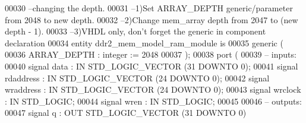 \begin{DoxyCode}
00030 \textcolor{keyword}{--changing the depth.}
00031 \textcolor{keyword}{--1)Set ARRAY\_DEPTH generic/parameter from 2048 to new depth.}
00032 \textcolor{keyword}{--2)Change mem\_array depth from 2047 to (new depth - 1).}
00033 \textcolor{keyword}{--3)VHDL only, don't forget the generic in component declaration}
00034 \textcolor{keywordflow}{entity }ddr2_mem_model_ram_module \textcolor{keywordflow}{is} 
00035         \textcolor{keywordflow}{generic} \textcolor{vhdlchar}{(}
00036                  \textcolor{vhdlchar}{ARRAY_DEPTH} \textcolor{vhdlchar}{:} \textcolor{comment}{integer} \textcolor{vhdlchar}{:=} \textcolor{vhdllogic}{}\textcolor{vhdllogic}{2048}
00037                  \textcolor{vhdlchar}{)};
00038         \textcolor{keywordflow}{port} \textcolor{vhdlchar}{(}
00039 \textcolor{keyword}{              -- inputs:}
00040                  \textcolor{keywordflow}{signal} \textcolor{vhdlchar}{data} \textcolor{vhdlchar}{:} \textcolor{keywordflow}{IN} \textcolor{comment}{STD\_LOGIC\_VECTOR} \textcolor{vhdlchar}{(}\textcolor{vhdllogic}{}\textcolor{vhdllogic}{31} \textcolor{keywordflow}{DOWNTO} \textcolor{vhdllogic}{}\textcolor{vhdllogic}{0}\textcolor{vhdlchar}{)};
00041                  \textcolor{keywordflow}{signal} \textcolor{vhdlchar}{rdaddress} \textcolor{vhdlchar}{:} \textcolor{keywordflow}{IN} \textcolor{comment}{STD\_LOGIC\_VECTOR} \textcolor{vhdlchar}{(}\textcolor{vhdllogic}{}\textcolor{vhdllogic}{24} \textcolor{keywordflow}{DOWNTO} \textcolor{vhdllogic}{}\textcolor{vhdllogic}{0}\textcolor{vhdlchar}{)};
00042                  \textcolor{keywordflow}{signal} \textcolor{vhdlchar}{wraddress} \textcolor{vhdlchar}{:} \textcolor{keywordflow}{IN} \textcolor{comment}{STD\_LOGIC\_VECTOR} \textcolor{vhdlchar}{(}\textcolor{vhdllogic}{}\textcolor{vhdllogic}{24} \textcolor{keywordflow}{DOWNTO} \textcolor{vhdllogic}{}\textcolor{vhdllogic}{0}\textcolor{vhdlchar}{)};
00043                  \textcolor{keywordflow}{signal} \textcolor{vhdlchar}{wrclock} \textcolor{vhdlchar}{:} \textcolor{keywordflow}{IN} \textcolor{comment}{STD\_LOGIC};
00044                  \textcolor{keywordflow}{signal} \textcolor{vhdlchar}{wren} \textcolor{vhdlchar}{:} \textcolor{keywordflow}{IN} \textcolor{comment}{STD\_LOGIC};
00045 
00046 \textcolor{keyword}{              -- outputs:}
00047                  \textcolor{keywordflow}{signal} \textcolor{vhdlchar}{q} \textcolor{vhdlchar}{:} \textcolor{keywordflow}{OUT} \textcolor{comment}{STD\_LOGIC\_VECTOR} \textcolor{vhdlchar}{(}\textcolor{vhdllogic}{}\textcolor{vhdllogic}{31} \textcolor{keywordflow}{DOWNTO} \textcolor{vhdllogic}{}\textcolor{vhdllogic}{0}\textcolor{vhdlchar}{)}

\end{DoxyCode}
